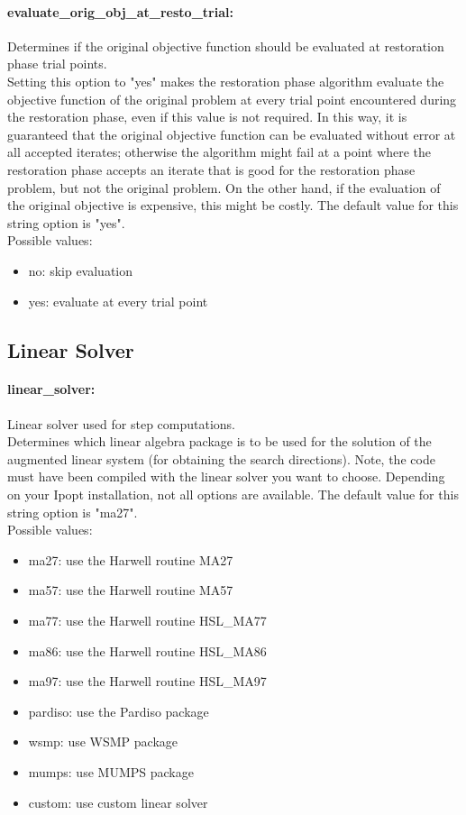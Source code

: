 \paragraph{evaluate\_orig\_obj\_at\_resto\_trial:}\label{opt:evaluate_orig_obj_at_resto_trial} Determines if the original objective function should be evaluated at restoration phase trial points. \\
 Setting this option to "yes" makes the restoration phase algorithm evaluate the objective function of the original problem at every trial point encountered during the restoration phase, even if this value is not required.  In this way, it is guaranteed that the original objective function can be evaluated without error at all accepted iterates; otherwise the algorithm might fail at a point where the restoration phase accepts an iterate that is good for the restoration phase problem, but not the original problem.  On the other hand, if the evaluation of the original objective is expensive, this might be costly. The default value for this string option is "yes".
\\ 
Possible values:
\begin{itemize}
   \item no: skip evaluation
   \item yes: evaluate at every trial point
\end{itemize}

\subsection{Linear Solver}

\paragraph{linear\_solver:}\label{opt:linear_solver} Linear solver used for step computations. \\
 Determines which linear algebra package is to be used for the solution of the augmented linear system (for obtaining the search directions). Note, the code must have been compiled with the linear solver you want to choose. Depending on your Ipopt installation, not all options are available. The default value for this string option is "ma27".
\\ 
Possible values:
\begin{itemize}
   \item ma27: use the Harwell routine MA27
   \item ma57: use the Harwell routine MA57
   \item ma77: use the Harwell routine HSL\_MA77
   \item ma86: use the Harwell routine HSL\_MA86
   \item ma97: use the Harwell routine HSL\_MA97
   \item pardiso: use the Pardiso package
   \item wsmp: use WSMP package
   \item mumps: use MUMPS package
   \item custom: use custom linear solver
\end{itemize}


